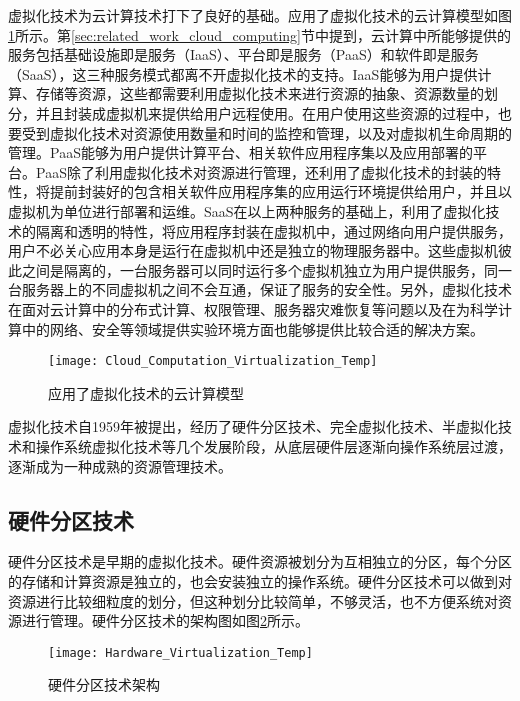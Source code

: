 虚拟化技术为云计算技术打下了良好的基础。应用了虚拟化技术的云计算模型如图\ref{fig:cloud_computation_virtualization}所示\citep{陈思锦2015云计算中的虚拟化技术与虚拟化安全}。第\ref{sec:related_work_cloud_computing}节中提到，云计算中所能够提供的服务包括基础设施即是服务（IaaS）、平台即是服务（PaaS）和软件即是服务（SaaS），这三种服务模式都离不开虚拟化技术的支持。IaaS能够为用户提供计算、存储等资源，这些都需要利用虚拟化技术来进行资源的抽象、资源数量的划分，并且封装成虚拟机来提供给用户远程使用。在用户使用这些资源的过程中，也要受到虚拟化技术对资源使用数量和时间的监控和管理，以及对虚拟机生命周期的管理。PaaS能够为用户提供计算平台、相关软件应用程序集以及应用部署的平台。PaaS除了利用虚拟化技术对资源进行管理，还利用了虚拟化技术的封装的特性，将提前封装好的包含相关软件应用程序集的应用运行环境提供给用户，并且以虚拟机为单位进行部署和运维。SaaS在以上两种服务的基础上，利用了虚拟化技术的隔离和透明的特性，将应用程序封装在虚拟机中，通过网络向用户提供服务，用户不必关心应用本身是运行在虚拟机中还是独立的物理服务器中。这些虚拟机彼此之间是隔离的，一台服务器可以同时运行多个虚拟机独立为用户提供服务，同一台服务器上的不同虚拟机之间不会互通，保证了服务的安全性。另外，虚拟化技术在面对云计算中的分布式计算、权限管理、服务器灾难恢复等问题以及在为科学计算中的网络、安全等领域提供实验环境方面也能够提供比较合适的解决方案\cite{2008半虚拟化技术分析与研究}。


\begin{figure}[!htbp]
    \centering
    \texttt{[image: Cloud\_Computation\_Virtualization\_Temp]}
    \caption{应用了虚拟化技术的云计算模型}
    \label{fig:cloud_computation_virtualization}
\end{figure}

虚拟化技术自1959年被提出，经历了硬件分区技术、完全虚拟化技术、半虚拟化技术和操作系统虚拟化技术等几个发展阶段\cite{肖伟民2019嵌入式虚拟化}，从底层硬件层逐渐向操作系统层过渡，逐渐成为一种成熟的资源管理技术。

\subsection{硬件分区技术}

硬件分区技术是早期的虚拟化技术。硬件资源被划分为互相独立的分区，每个分区的存储和计算资源是独立的，也会安装独立的操作系统\cite{plessl2004virtualization}。硬件分区技术可以做到对资源进行比较细粒度的划分，但这种划分比较简单，不够灵活，也不方便系统对资源进行管理。硬件分区技术的架构图如图\ref{fig:hardware_virtualization}所示\cite{肖伟民2019嵌入式虚拟化}。

\begin{figure}[!htbp]
    \centering
    \texttt{[image: Hardware\_Virtualization\_Temp]}
    \caption{硬件分区技术架构}
    \label{fig:hardware_virtualization}
\end{figure}

